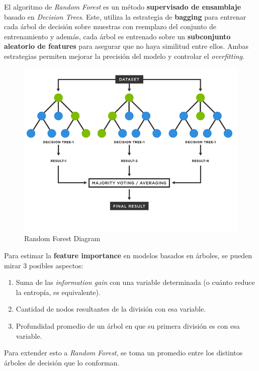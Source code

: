 El algoritmo de \textit{Random Forest} es un método \textbf{supervisado de ensamblaje} basado en \textit{Decision Trees}. Este, utiliza la estrategia de \textbf{bagging} para entrenar cada árbol de decisión sobre muestras con reemplazo del conjunto de entrenamiento y además, cada árbol es entrenado sobre un \textbf{subconjunto aleatorio de features} para asegurar que no haya similitud entre ellos. Ambas estrategias permiten mejorar la precisión del modelo y controlar el  \textit{overfitting}.

\begin{figure}[H]
    \center
    \includegraphics[scale=0.25]{notebooks/ML/img/random_forest_diagram.png}
    \caption{Random Forest Diagram}
\end{figure}

Para estimar la \textbf{feature importance} en modelos basados en árboles, se pueden mirar 3 posibles aspectos: 
\begin{enumerate}
    \item Suma de las \textit{information gain} con una variable determinada (o cuánto reduce la entropía, es equivalente). 
    \item Cantidad de nodos resultantes de la división con esa variable. 
    \item Profundidad promedio de un árbol en que su primera división es con esa variable. 
\end{enumerate}

Para extender esto a \textit{Random Forest}, se toma un promedio entre los distintos árboles de decisión que lo conforman. 

